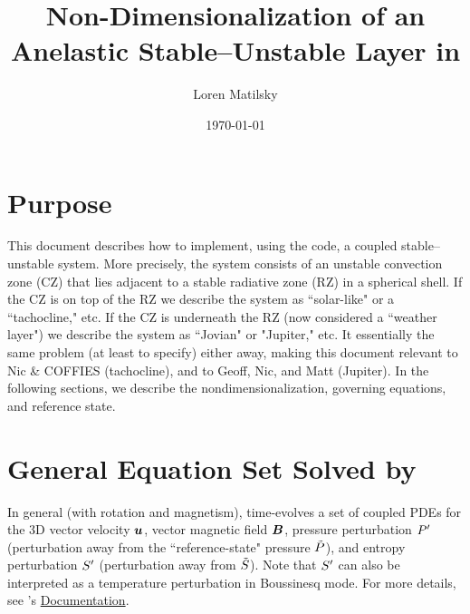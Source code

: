 \documentclass[12pt]{article}
\date{\today}
\author{Loren Matilsky}
\title{Non-Dimensionalization of an Anelastic Stable--Unstable Layer in {\rayleigh}}
\numberwithin{equation}{section}
\begin{document}
	\maketitle
	\section{Purpose}\label{sec:purpose}
	This document describes how to implement, using the {\rayleigh} code, a coupled stable--unstable system. More precisely, the system consists of an unstable convection zone (CZ) that lies adjacent to a stable radiative zone (RZ) in a spherical shell. If the CZ is on top of the RZ we describe the system as ``solar-like" or a ``tachocline," etc. If the CZ is underneath the RZ (now considered a ``weather layer") we describe the system as ``Jovian" or "Jupiter," etc. It essentially the same problem (at least to specify) either away, making this document relevant to Nic \& COFFIES (tachocline), and to Geoff, Nic, and Matt (Jupiter). In the following sections, we describe the nondimensionalization, governing equations, and reference state. 
	
	\section{General Equation Set Solved by {\rayleigh}}\label{sec:eqgen}
	In general (with rotation and magnetism), {\rayleigh} time-evolves a set of coupled PDEs for the 3D vector velocity $\bm{u}$, vector magnetic field $\bm{B}$, pressure perturbation ${P^\prime}$ (perturbation away from the ``reference-state" pressure $\tilde{P}$), and entropy perturbation ${S^\prime}$ (perturbation away from $\tilde{S}$). Note that ${S^\prime}$ can also be interpreted as a temperature perturbation in Boussinesq mode. For more details, see {\rayleigh}'s \href{https://rayleigh-documentation.readthedocs.io/en/latest/doc/source/User_Guide/physics_math_overview.html#the-system-of-equations-solved-in-rayleigh}{Documentation}. 
	
\end{document}
